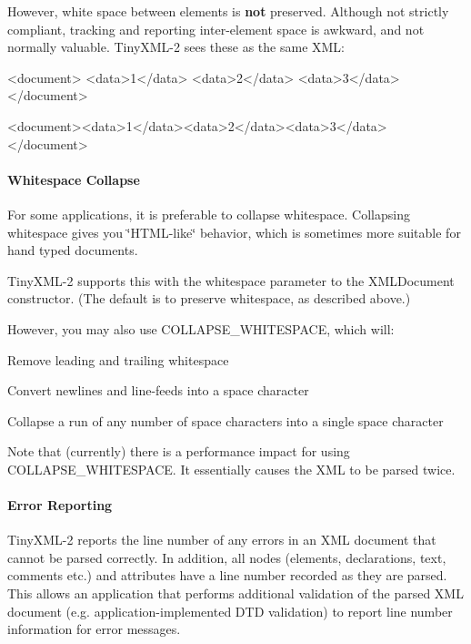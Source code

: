 However, white space between elements is {\bfseries{not}} preserved. Although not strictly compliant, tracking and reporting inter-\/element space is awkward, and not normally valuable. Tiny\+X\+M\+L-\/2 sees these as the same X\+ML\+: \begin{DoxyVerb}<document>
    <data>1</data>
    <data>2</data>
    <data>3</data>
</document>

<document><data>1</data><data>2</data><data>3</data></document>
\end{DoxyVerb}


\paragraph*{Whitespace Collapse}

For some applications, it is preferable to collapse whitespace. Collapsing whitespace gives you \char`\"{}\+H\+T\+M\+L-\/like\char`\"{} behavior, which is sometimes more suitable for hand typed documents.

Tiny\+X\+M\+L-\/2 supports this with the \textquotesingle{}whitespace\textquotesingle{} parameter to the X\+M\+L\+Document constructor. (The default is to preserve whitespace, as described above.)

However, you may also use C\+O\+L\+L\+A\+P\+S\+E\+\_\+\+W\+H\+I\+T\+E\+S\+P\+A\+CE, which will\+:


\begin{DoxyItemize}
\item Remove leading and trailing whitespace
\item Convert newlines and line-\/feeds into a space character
\item Collapse a run of any number of space characters into a single space character
\end{DoxyItemize}

Note that (currently) there is a performance impact for using C\+O\+L\+L\+A\+P\+S\+E\+\_\+\+W\+H\+I\+T\+E\+S\+P\+A\+CE. It essentially causes the X\+ML to be parsed twice.

\paragraph*{Error Reporting}

Tiny\+X\+M\+L-\/2 reports the line number of any errors in an X\+ML document that cannot be parsed correctly. In addition, all nodes (elements, declarations, text, comments etc.) and attributes have a line number recorded as they are parsed. This allows an application that performs additional validation of the parsed X\+ML document (e.\+g. application-\/implemented D\+TD validation) to report line number information for error messages.

